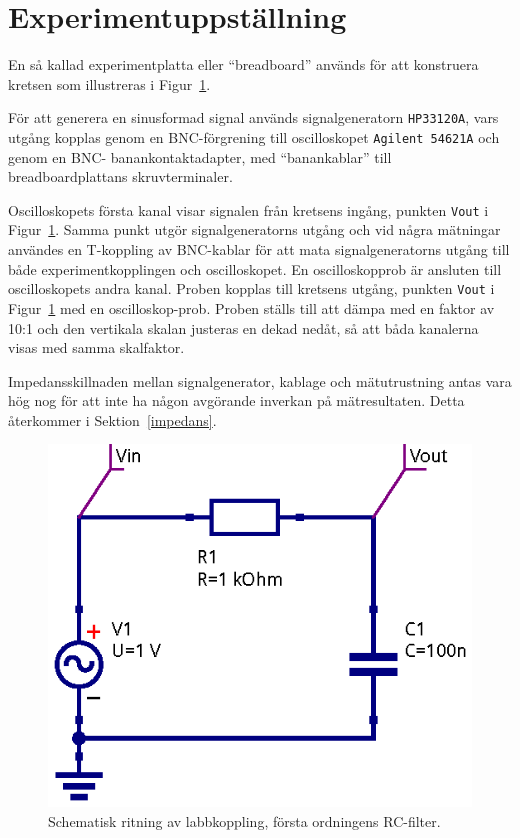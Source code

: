 \section{Experimentuppställning}\label{}
En så kallad experimentplatta eller ``breadboard'' används för att konstruera
kretsen som illustreras i Figur~\ref{fig:rc-schema}.  \par För att generera en
sinusformad signal används signalgeneratorn \texttt{HP33120A}, vars utgång
kopplas genom en BNC-förgrening till oscilloskopet \texttt{Agilent 54621A} och
genom en BNC- banankontaktadapter, med ``banankablar'' till breadboardplattans
skruvterminaler.  \par Oscilloskopets första kanal visar signalen från kretsens
ingång, punkten \texttt{Vout} i Figur~\ref{fig:rc-schema}. Samma punkt utgör
signalgeneratorns utgång och vid några mätningar användes en T-koppling av
BNC-kablar för att mata signalgeneratorns utgång till både experimentkopplingen
och oscilloskopet.  En oscilloskopprob är ansluten till oscilloskopets andra
kanal. Proben kopplas till kretsens utgång, punkten \texttt{Vout} i
Figur~\ref{fig:rc-schema} med en oscilloskop-prob. Proben ställs till att dämpa
med en faktor av 10:1 och den vertikala skalan justeras en dekad nedåt, så att
båda kanalerna visas med samma skalfaktor.
\par Impedansskillnaden mellan signalgenerator, kablage och mätutrustning antas
vara hög nog för att inte ha någon avgörande inverkan på mätresultaten. Detta
återkommer i Sektion~\ref{impedans}.

\begin{figure}\label{fig:rc-schema}
  \centering
  \includegraphics[width=0.8\linewidth]{sim/ee466_lab-4_prj/uppgift-0_schema}
  \caption[Schematisk ritning av labbkoppling, första ordningens RC-filter.]
  {Schematisk ritning av labbkoppling, första ordningens RC-filter.}
\end{figure}

